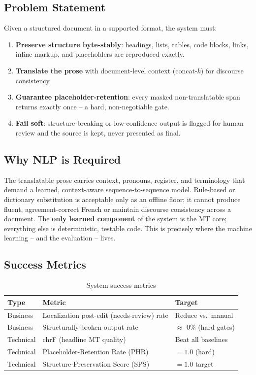 \documentclass[12pt,a4paper]{article}
\begin{document}
\subsection{Problem Statement}

Given a structured document in a supported format, the system must:
\begin{enumerate}
  \item \textbf{Preserve structure byte-stably}: headings, lists, tables, code blocks, links, inline markup, and placeholders are reproduced exactly.
  \item \textbf{Translate the prose} with document-level context (concat-$k$) for discourse consistency.
  \item \textbf{Guarantee placeholder-retention}: every masked non-translatable span returns exactly once -- a hard, non-negotiable gate.
  \item \textbf{Fail soft}: structure-breaking or low-confidence output is flagged for human review and the source is kept, never presented as final.
\end{enumerate}

\subsection{Why NLP is Required}

The translatable prose carries context, pronouns, register, and terminology that demand a learned, context-aware sequence-to-sequence model. Rule-based or dictionary substitution is acceptable only as an offline floor; it cannot produce fluent, agreement-correct French or maintain discourse consistency across a document. The \textbf{only learned component} of the system is the MT core; everything else is deterministic, testable code. This is precisely where the machine learning -- and the evaluation -- lives.

\subsection{Success Metrics}

\begin{table}[H]
\centering
\caption{System success metrics}
\begin{tabular}{lll}
\toprule
\textbf{Type} & \textbf{Metric} & \textbf{Target} \\
\midrule
Business & Localization post-edit (needs-review) rate & Reduce vs.\ manual \\
Business & Structurally-broken output rate & $\approx$ 0\% (hard gates) \\
Technical & chrF (headline MT quality) & Beat all baselines \\
Technical & Placeholder-Retention Rate (PHR) & $=1.0$ (hard) \\
Technical & Structure-Preservation Score (SPS) & $=1.0$ target \\
\bottomrule
\end{tabular}
\end{table}
\end{document}
